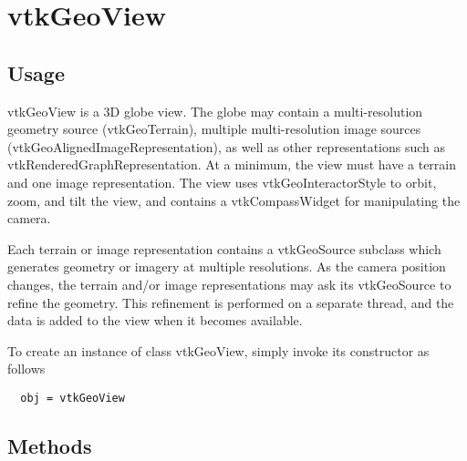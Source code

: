 \section{vtkGeoView}

\subsection{Usage}

 vtkGeoView is a 3D globe view. The globe may contain a multi-resolution
 geometry source (vtkGeoTerrain), multiple multi-resolution image sources
 (vtkGeoAlignedImageRepresentation), as well as other representations such
 as vtkRenderedGraphRepresentation. At a minimum, the view must have a terrain
 and one image representation. The view uses vtkGeoInteractorStyle to orbit,
 zoom, and tilt the view, and contains a vtkCompassWidget for manipulating
 the camera.

 Each terrain or image representation contains a vtkGeoSource subclass which
 generates geometry or imagery at multiple resolutions. As the camera
 position changes, the terrain and/or image representations may ask its
 vtkGeoSource to refine the geometry. This refinement is performed on a
 separate thread, and the data is added to the view when it becomes available.


To create an instance of class vtkGeoView, simply
invoke its constructor as follows
\begin{verbatim}
  obj = vtkGeoView
\end{verbatim}
\subsection{Methods}

